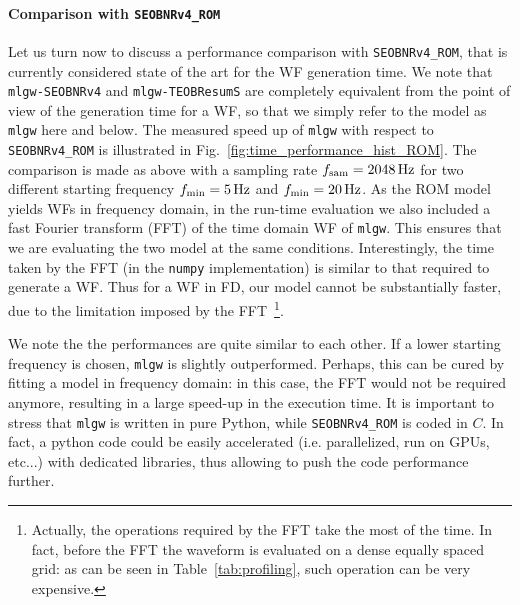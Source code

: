 \documentclass[twocolumn,showpacs,preprintnumbers,nofootinbib,prd,
superscriptaddress,10pt]{revtex4-1}
\begin{document}
\paragraph{Comparison with \texttt{SEOBNRv4\_ROM}}
Let us turn now to discuss a performance comparison with \texttt{SEOBNRv4\_ROM}, that
is currently considered state of the art for the WF generation time.
We note that  \texttt{mlgw-SEOBNRv4}  and \texttt{mlgw-TEOBResumS} are completely
equivalent from the point of view of the generation time for a WF,
so that we simply refer to the model as {\tt mlgw} here and below.
The measured speed up of {\tt mlgw} with respect to \texttt{SEOBNRv4\_ROM} 
is illustrated in Fig.~\ref{fig:time_performance_hist_ROM}.
The comparison is made as above with a sampling rate $f_{\rm sam}=\SI{2048}{Hz}$ for two 
different starting frequency $f_{\rm min} = \SI{5}{Hz}$ and $f_{\rm min} = \SI{20}{Hz}$.
As the ROM model yields WFs in frequency domain, 
in the run-time evaluation we also included a fast Fourier transform (FFT) of the time 
domain WF of \texttt{mlgw}.  This ensures that we are evaluating 
the two model at the same conditions.
Interestingly, the time taken by the FFT (in the \texttt{numpy}
implementation) is similar to that required to generate a WF. Thus for
a WF in FD, our model cannot be substantially faster, due to the
limitation imposed by the FFT~\footnote{Actually, the operations required by
the FFT take the most of the time. In fact,  before the FFT the waveform 
is evaluated on a dense equally spaced grid: as can be seen in 
Table~\ref{tab:profiling}, such operation can be very expensive.}.

We note the the performances are quite similar to each other.
If a lower starting frequency is chosen, \texttt{mlgw} 
is slightly outperformed. Perhaps, this can be cured by fitting a model in frequency domain: 
in this case, the FFT would not be required anymore, resulting in a large speed-up in the execution time.
It is important to stress that \texttt{mlgw}  is written in pure Python, 
while \texttt{SEOBNRv4\_ROM} is coded in $C$.
In fact, a python code could be easily accelerated (i.e. parallelized, run on GPUs, etc...) 
with dedicated libraries, thus allowing to push the code performance further.
%
\end{document}

